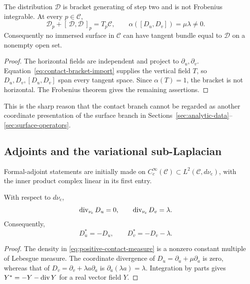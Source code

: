 \begin{proposition}
\label{prop:contact-frobenius-obstruction}
The distribution $\mathcal D$ is bracket generating of step two and is not
Frobenius integrable.  At every $p\in\mathcal C$,
\[
 \mathcal D_p+[\,\mathcal D,\mathcal D\,]_p=T_p\mathcal C,\qquad
 \alpha([D_u,D_v])=\mu\lambda\ne0.
\]
Consequently no immersed surface in $\mathcal C$ can have tangent bundle equal to
$\mathcal D$ on a nonempty open set.
\end{proposition}

\begin{proof}
The horizontal fields are independent and project to
$\partial_u,\partial_v$.  Equation~\eqref{eq:contact-bracket-import} supplies the
vertical field $T$, so $D_u,D_v,[D_u,D_v]$ span every tangent space.  Since
$\alpha(T)=1$, the bracket is not horizontal.  The Frobenius theorem gives the
remaining assertions.
\end{proof}

This is the sharp reason that the contact branch cannot be regarded as another
coordinate presentation of the surface branch in
Sections~\ref{sec:analytic-data}--\ref{sec:surface-operators}.

\subsection{Adjoints and the variational sub-Laplacian}

Formal-adjoint statements are initially made on
$C_c^\infty(\mathcal C)\subset L^2(\mathcal C,d\nu_{\mathrm c})$, with the inner
product complex linear in its first entry.

\begin{proposition}
\label{prop:contact-divergence-adjoints}
With respect to $d\nu_{\mathrm c}$,
\begin{equation}\label{eq:contact-divergences}
 \operatorname{div}_{\nu_{\mathrm c}}D_u=0,\qquad
 \operatorname{div}_{\nu_{\mathrm c}}D_v=\lambda.
\end{equation}
Consequently,
\begin{equation}\label{eq:contact-first-order-adjoints}
 D_u^*=-D_u,\qquad D_v^*=-D_v-\lambda.
\end{equation}
\end{proposition}

\begin{proof}
The density in \eqref{eq:positive-contact-measure} is a nonzero constant multiple
of Lebesgue measure.  The coordinate divergence of
$D_u=\partial_u+\mu\partial_a$ is zero, whereas that of
$D_v=\partial_v+\lambda a\partial_a$ is
$\partial_a(\lambda a)=\lambda$.  Integration by parts gives
$Y^*=-Y-\operatorname{div} Y$ for a real vector field $Y$.
\end{proof}

